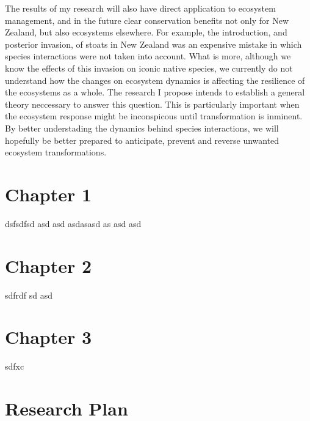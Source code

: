 \documentclass[a4paper]{report}
\begin{document}
The results of my research will also have direct application to ecosystem management, and in the future clear conservation benefits not only for New Zealand, but also ecosystems elsewhere. 
For example, the introduction, and posterior invasion, of stoats in New Zealand was an expensive mistake in which species interactions were not taken into account. 
What is more, although we know the effects of this invasion on iconic native species, we currently do not understand how the changes on ecosystem dynamics is affecting the resilience of the ecosystems as a whole.
The research I propose intends to establish a general theory neccessary to answer this question. 
This is particularly important when the ecosystem response might be inconspicous until transformation is inminent.
By better understading the dynamics behind species interactions, we will hopefully be better prepared to anticipate, prevent and reverse unwanted ecosystem transformations.

\chapter*{Chapter 1}

dsfsdfsd asd asd asdasasd as asd asd

\chapter*{Chapter 2}

sdfrdf sd
asd
\chapter*{Chapter 3}

sdfxc 

\chapter*{Research Plan}


\end{document}
